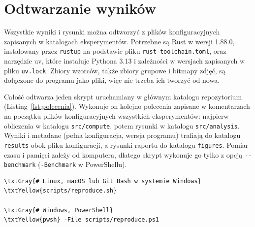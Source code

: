 \section{Odtwarzanie wyników}
\label{app:odtwarzanie}

Wszystkie wyniki i rysunki można odtworzyć z plików konfiguracyjnych zapisanych w katalogach eksperymentów. Potrzebne są Rust w wersji 1.88.0, instalowany przez \texttt{rustup} na podstawie pliku \texttt{rust-toolchain.toml}, oraz narzędzie uv, które instaluje Pythona 3.13 i zależności w wersjach zapisanych w pliku \texttt{uv.lock}. Zbiory wzorców, także zbiory grupowe i bitmapy zdjęć, są dołączone do programu jako pliki, więc nie trzeba ich tworzyć od nowa.

Całość odtwarza jeden skrypt uruchamiany w głównym katalogu repozytorium (Listing~\ref{lst:polecenia}). Wykonuje on kolejno polecenia zapisane w komentarzach na początku plików konfiguracyjnych wszystkich eksperymentów: najpierw obliczenia w katalogu \texttt{src/compute}, potem rysunki w katalogu \texttt{src/analysis}. Wyniki i metadane (pełna konfiguracja, wersja programu) trafiają do katalogu \texttt{results} obok pliku konfiguracji, a rysunki raportu do katalogu \texttt{figures}. Pomiar czasu i pamięci zależy od komputera, dlatego skrypt wykonuje go tylko z opcją \texttt{-{}-benchmark} (\texttt{-Benchmark} w PowerShellu).

\begin{code}[H]
\begin{Verbatim}[fontsize=\small, commandchars=\\\{\}]
\txtGray{# Linux, macOS lub Git Bash w systemie Windows}
\txtYellow{scripts/reproduce.sh}

\txtGray{# Windows, PowerShell}
\txtYellow{pwsh} -File scripts/reproduce.ps1
\end{Verbatim}
    \caption{Polecenia odtwarzające wszystkie eksperymenty i rysunki.}
    \label{lst:polecenia}
\end{code}
